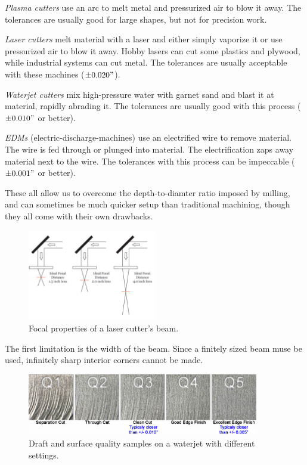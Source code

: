  \begin{asparaenum}[a)]
  	\item \textit{Plasma cutters} use an arc to melt metal and pressurized air to blow it away. The tolerances are usually good for large shapes, but not for precision work.
 	\item \textit{Laser cutters} melt material with a laser and either simply vaporize it or use pressurized air to blow it away. Hobby lasers can cut some plastics and plywood, while industrial systems can cut metal. The tolerances are usually acceptable with these machines ($\pm 0.020"$).
 	\item \textit{Waterjet cutters} mix high-pressure water with garnet sand and blast it at material, rapidly abrading it. The tolerances are usually good with this process ($\pm 0.010"$ or better).
 	\item \textit{EDMs} (electric-discharge-machines) use an electrified wire to remove material. The wire is fed through or plunged into material. The electrification zaps away material next to the wire. The tolerances with this process can be impeccable ($\pm 0.001"$ or better). 
\end{asparaenum}
 	
 	These all allow us to overcome the depth-to-diamter ratio imposed by milling, and can sometimes be much quicker setup than traditional machining, though they all come with their own drawbacks.
 
 \begin{figure}[H] \centering
 	\includegraphics[width=0.5\textwidth]{imgs/lasercut_focus.jpeg}
 	\caption{Focal properties of a laser cutter's beam.}
 \end{figure}
 
  The first limitation is the width of the beam. Since a finitely sized beam muse be used, infinitely sharp interior corners cannot be made.
 
 \begin{figure}[H] \centering
 	\includegraphics[width=0.9\textwidth]{imgs/waterjet_draft.jpeg}
 	\caption{Draft and surface quality samples on a waterjet with different settings.}
 \end{figure}
 
